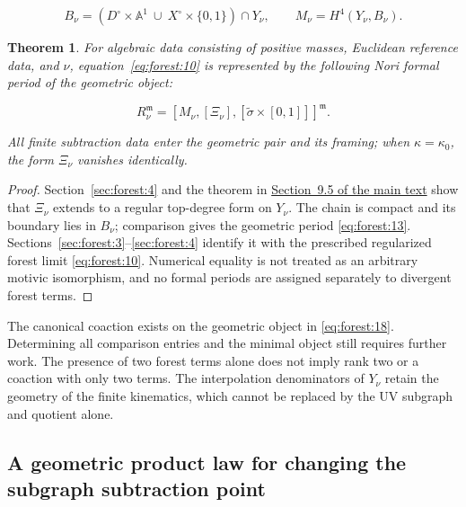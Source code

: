 \documentclass[11pt,a4paper,oneside]{article}
\theoremstyle{plain}
\newtheorem{theorem}{Theorem}[section]
\theoremstyle{definition}
\theoremstyle{remark}
\numberwithin{equation}{section}
\newcommand{\otherref}[2]{\href{#1.pdf}{#2}}
\begin{document}
\begin{equation}
B_\nu=(D^\circ\times\mathbb A^1
            \ \cup\ X^\circ\times\{0,1\})\cap Y_\nu,\qquad
 M_\nu=H^4(Y_\nu,B_\nu).                                       \label{eq:forest:17}
\end{equation}

\begin{theorem}

\label{thm:forest:5.1} For algebraic data consisting of positive masses, Euclidean reference data, and \(\nu \), equation~\eqref{eq:forest:10} is represented by the following Nori formal period of the geometric object:

\begin{equation}
R_\nu^{\mathfrak m}
       =[M_\nu,[\Xi_\nu],[\widetilde\sigma\times[0,1]]]^{\mathfrak m}.       \label{eq:forest:18}
\end{equation}

All finite subtraction data enter the geometric pair and its framing; when \(\kappa =\kappa _0\), the form \(\Xi _\nu \) vanishes identically.

\end{theorem}

\begin{proof}

Section~\ref{sec:forest:4} and the theorem in \otherref{feynman_periods_long_paper_en}{Section~9.5 of the main text} show that \(\Xi _\nu \) extends to a regular top-degree form on \(Y_\nu \). The chain is compact and its boundary lies in \(B_\nu \); comparison gives the geometric period \eqref{eq:forest:13}. Sections~\ref{sec:forest:3}--\ref{sec:forest:4} identify it with the prescribed regularized forest limit \eqref{eq:forest:10}. Numerical equality is not treated as an arbitrary motivic isomorphism, and no formal periods are assigned separately to divergent forest terms.

\end{proof}

The canonical coaction exists on the geometric object in \eqref{eq:forest:18}. Determining all comparison entries and the minimal object still requires further work. The presence of two forest terms alone does not imply rank two or a coaction with only two terms. The interpolation denominators of \(Y_\nu \) retain the geometry of the finite kinematics, which cannot be replaced by the UV subgraph and quotient alone.


\subsection{A geometric product law for changing the subgraph subtraction point}\label{sec:forest:6}
\end{document}
